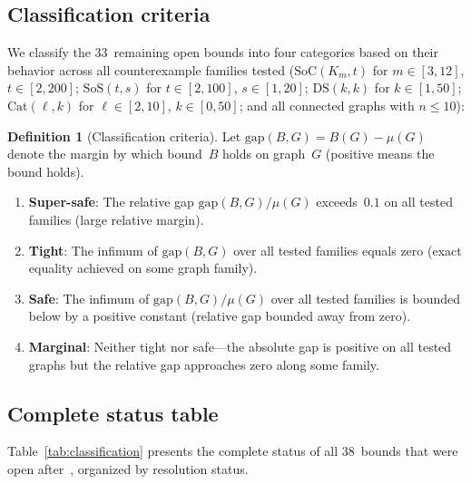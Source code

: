 \documentclass[preprint,12pt]{elsarticle}
\theoremstyle{definition}
\newtheorem{definition}[theorem]{Definition}
\theoremstyle{remark}
\newcommand{\SoC}{\mathrm{SoC}}       %
\newcommand{\SoS}{\mathrm{SoS}}       %
\newcommand{\DS}{\mathrm{DS}}          %
\newcommand{\Cat}{\mathrm{Cat}}        %
\newcommand{\Lspec}{\mu}               %
\begin{document}
\subsection{Classification criteria}\label{ssec:criteria}

We classify the 33~remaining open bounds into four categories based on
their behavior across all counterexample families tested ($\SoC(K_m, t)$
for $m \in [3,12]$, $t \in [2, 200]$; $\SoS(t, s)$ for $t \in [2, 100]$,
$s \in [1, 20]$; $\DS(k, k)$ for $k \in [1, 50]$; $\Cat(\ell, k)$ for
$\ell \in [2, 10]$, $k \in [0, 50]$; and all connected graphs with
$n \leq 10$):

\begin{definition}[Classification criteria]\label{def:classification}
  Let $\mathrm{gap}(B, G) = B(G) - \Lspec(G)$ denote the margin by
  which bound~$B$ holds on graph~$G$ (positive means the bound holds).
  \begin{enumerate}[label=\textup{(\roman*)}]
    \item \textbf{Super-safe}: The relative gap $\mathrm{gap}(B, G)/\Lspec(G)$
      exceeds~$0.1$ on all tested families (large relative margin).
    \item \textbf{Tight}: The infimum of $\mathrm{gap}(B, G)$ over all
      tested families equals zero (exact equality achieved on some graph
      family).
    \item \textbf{Safe}: The infimum of $\mathrm{gap}(B, G)/\Lspec(G)$
      over all tested families is bounded below by a positive constant
      (relative gap bounded away from zero).
    \item \textbf{Marginal}: Neither tight nor safe---the absolute gap is
      positive on all tested graphs but the relative gap approaches zero
      along some family.
  \end{enumerate}
\end{definition}

\subsection{Complete status table}\label{ssec:status-table}

Table~\ref{tab:classification} presents the complete status of all
38~bounds that were open after~\cite{Ghebleh2024}, organized by
resolution status.
\end{document}
